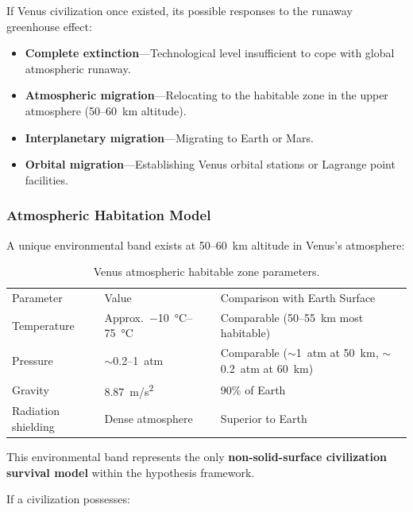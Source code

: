 \documentclass[aps,prd,twocolumn,superscriptaddress,nofootinbib]{revtex4-2}
\begin{document}
If Venus civilization once existed, its possible responses to the runaway greenhouse effect:

\begin{itemize}
  \item \textbf{Complete extinction}---Technological level insufficient to cope with global atmospheric runaway.
  \item \textbf{Atmospheric migration}---Relocating to the habitable zone in the upper atmosphere (50--60~km altitude).
  \item \textbf{Interplanetary migration}---Migrating to Earth or Mars.
  \item \textbf{Orbital migration}---Establishing Venus orbital stations or Lagrange point facilities.
\end{itemize}

\subsubsection{Atmospheric Habitation Model}\label{sec:venus-atmo}

A unique environmental band exists at 50--60~km altitude in Venus's atmosphere:

\begin{table}[htbp]
\caption{Venus atmospheric habitable zone parameters.}
\label{tab:venus-atmo}
\begin{ruledtabular}
\begin{tabular}{lll}
Parameter & Value & Comparison with Earth Surface \\
\colrule
Temperature & Approx.\ \SIrange{-10}{75}{\degreeCelsius} & Comparable (50--55~km most habitable) \\
Pressure & ${\sim}$0.2--\SI{1}{atm} & Comparable (${\sim}$\SI{1}{atm} at \SI{50}{km}, ${\sim}$\SI{0.2}{atm} at \SI{60}{km}) \\
Gravity & \SI{8.87}{m/s^2} & 90\% of Earth \\
Radiation shielding & Dense atmosphere & Superior to Earth \\
\end{tabular}
\end{ruledtabular}
\end{table}

This environmental band represents the only \textbf{non-solid-surface civilization survival model} within the hypothesis framework.

If a civilization possesses:
\end{document}
